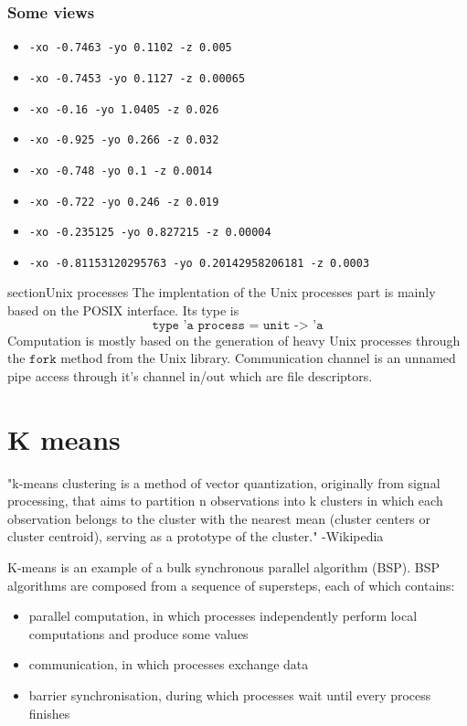 \documentclass{article}
\begin{document}
\subsubsection{Some views}
\begin{itemize}[label={}]
	\item \texttt{-xo -0.7463 -yo 0.1102 -z 0.005}
	\item \texttt{-xo -0.7453 -yo 0.1127 -z 0.00065}
	\item \texttt{-xo -0.16 -yo 1.0405 -z 0.026}
	\item \texttt{-xo -0.925 -yo 0.266 -z 0.032}
	\item \texttt{-xo -0.748 -yo 0.1 -z 0.0014}
	\item \texttt{-xo -0.722 -yo 0.246 -z 0.019}
	\item \texttt{-xo -0.235125 -yo 0.827215 -z 0.00004}
	\item \texttt{-xo -0.81153120295763 -yo 0.20142958206181 -z 0.0003}
\end{itemize}
section{Unix processes}
The implentation of the Unix processes part is mainly based on the POSIX interface. Its type is $$\texttt{type 'a process = unit -> 'a}$$
Computation is mostly based on the generation of heavy Unix processes through the $\texttt{fork}$ method from the Unix library.
Communication channel is an unnamed pipe access through it's channel in/out which are file descriptors.

\section{K means}

"k-means clustering is a method of vector quantization, originally from signal processing, that aims to partition n observations into k clusters in which each observation belongs to the cluster with the nearest mean (cluster centers or cluster centroid), serving as a prototype of the cluster." 
-Wikipedia

K-means is an example of a bulk synchronous parallel algorithm (BSP). BSP algorithms are composed from a sequence of supersteps, each of which contains:
\begin{itemize}
    \item parallel computation, in which processes independently perform local computations and produce some values
    \item communication, in which processes exchange data
    \item barrier synchronisation, during which processes wait until every process finishes

\end{itemize}
\end{document}
